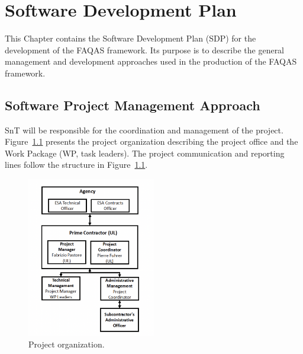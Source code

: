 \chapter{Software Development Plan}

%

\label{chapter:software_development}
This Chapter contains the Software Development Plan (SDP) for the development of the FAQAS framework. Its purpose is to describe the general management and development approaches used in the production of the FAQAS framework.

\section{Software Project Management Approach}

SnT will be responsible for the coordination and management of the project. Figure~\ref{fig:reporting_lines} presents the project organization describing the project office and the Work Package (WP, task leaders). The project communication and reporting lines follow the structure in Figure~\ref{fig:reporting_lines}.

\begin{figure}[H]
\caption{Project organization.}
\label{fig:reporting_lines}
\centering
\includegraphics[width=0.5\textwidth]{images/reporting_lines}
\end{figure}

